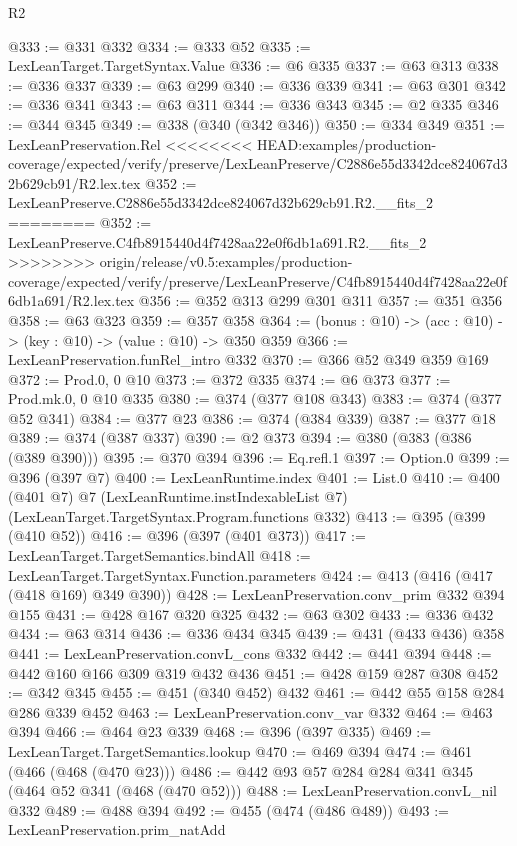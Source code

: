 \begin{lexlean}{R2}
\begin{coremodule}
{{{{{{{{{{{{{{{{{{{{{{@333 := @331 @332
@334 := @333 @52
@335 := LexLeanTarget.TargetSyntax.Value
@336 := @6 @335
@337 := @63 @313
@338 := @336 @337
@339 := @63 @299
@340 := @336 @339
@341 := @63 @301
@342 := @336 @341
@343 := @63 @311
@344 := @336 @343
@345 := @2 @335
@346 := @344 @345
@349 := @338 (@340 (@342 @346))
@350 := @334 @349
@351 := LexLeanPreservation.Rel
<<<<<<<< HEAD:examples/production-coverage/expected/verify/preserve/LexLeanPreserve/C2886e55d3342dce824067d32b629cb91/R2.lex.tex
@352 := LexLeanPreserve.C2886e55d3342dce824067d32b629cb91.R2.__fits_2
========
@352 := LexLeanPreserve.C4fb8915440d4f7428aa22e0f6db1a691.R2.__fits_2
>>>>>>>> origin/release/v0.5:examples/production-coverage/expected/verify/preserve/LexLeanPreserve/C4fb8915440d4f7428aa22e0f6db1a691/R2.lex.tex
@356 := @352 @313 @299 @301 @311
@357 := @351 @356
@358 := @63 @323
@359 := @357 @358
@364 := (bonus : @10) -> (acc : @10) -> (key : @10) -> (value : @10) -> @350 @359
@366 := LexLeanPreservation.funRel_intro @332
@370 := @366 @52 @349 @359 @169
@372 := Prod.{0, 0} @10
@373 := @372 @335
@374 := @6 @373
@377 := Prod.mk.{0, 0} @10 @335
@380 := @374 (@377 @108 @343)
@383 := @374 (@377 @52 @341)
@384 := @377 @23
@386 := @374 (@384 @339)
@387 := @377 @18
@389 := @374 (@387 @337)
@390 := @2 @373
@394 := @380 (@383 (@386 (@389 @390)))
@395 := @370 @394
@396 := Eq.refl.{1}
@397 := Option.{0}
@399 := @396 (@397 @7)
@400 := LexLeanRuntime.index
@401 := List.{0}
@410 := @400
    (@401 @7)
    @7
    (LexLeanRuntime.instIndexableList @7)
    (LexLeanTarget.TargetSyntax.Program.functions @332)
@413 := @395 (@399 (@410 @52))
@416 := @396 (@397 (@401 @373))
@417 := LexLeanTarget.TargetSemantics.bindAll
@418 := LexLeanTarget.TargetSyntax.Function.parameters
@424 := @413 (@416 (@417 (@418 @169) @349 @390))
@428 := LexLeanPreservation.conv_prim @332 @394 @155
@431 := @428 @167 @320 @325
@432 := @63 @302
@433 := @336 @432
@434 := @63 @314
@436 := @336 @434 @345
@439 := @431 (@433 @436) @358
@441 := LexLeanPreservation.convL_cons @332
@442 := @441 @394
@448 := @442 @160 @166 @309 @319 @432 @436
@451 := @428 @159 @287 @308
@452 := @342 @345
@455 := @451 (@340 @452) @432
@461 := @442 @55 @158 @284 @286 @339 @452
@463 := LexLeanPreservation.conv_var @332
@464 := @463 @394
@466 := @464 @23 @339
@468 := @396 (@397 @335)
@469 := LexLeanTarget.TargetSemantics.lookup
@470 := @469 @394
@474 := @461 (@466 (@468 (@470 @23)))
@486 := @442 @93 @57 @284 @284 @341 @345 (@464 @52 @341 (@468 (@470 @52)))
@488 := LexLeanPreservation.convL_nil @332
@489 := @488 @394
@492 := @455 (@474 (@486 @489))
@493 := LexLeanPreservation.prim_natAdd
}}}}}}}}}}}}}}}}}}}}}}
\end{coremodule}
\end{lexlean}
